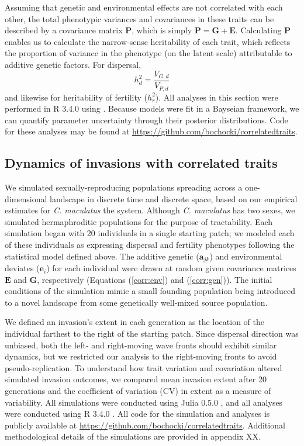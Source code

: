 Assuming that genetic and environmental effects are not correlated with each other, the total phenotypic variances and covariances in these traits can be described by a covariance matrix $\bm{P}$, which is simply $\bm{P} = \bm{G} + \bm{E}$. Calculating $\bm{P}$ enables us to calculate the narrow-sense heritability of each trait, which reflects the proportion of variance in the phenotype (on the latent scale) attributable to additive genetic factors. For dispersal,
%
\begin{equation}\label{corr:heritability}
  h^{2}_d = \frac{V_{G,d}}{V_{P,d}}
\end{equation}
%
and likewise for heritability of fertility ($h^{2}_r$). All analyses in this section were performed in R 3.4.0 \citep{r_core_team_r:_2015} using  \citep{stan_development_team_rstan:_2015}. Because models were fit in a Bayseian framework, we can quantify parameter uncertainty through their posterior distributions. Code for these analyses may be found at \url{https://github.com/bochocki/correlatedtraits}. 

\subsection{Dynamics of invasions with correlated traits}
We simulated sexually-reproducing populations spreading across a one-dimensional landscape in discrete time and discrete space, based on our empirical estimates for \textit{C. maculatus} the system. Although \textit{C. maculatus} has two sexes, we simulated hermaphroditic populations for the purpose of tractability. Each simulation began with 20 individuals in a single starting patch; we modeled each of these individuals as expressing dispersal and fertility phenotypes following the statistical model defined above. The additive genetic ($\bm{a}_{jk}$) and environmental deviates ($\bm{e}_i$) for each individual were drawn at random given covariance matrices $\bm{E}$ and $\bm{G}$, respectively (Equations (\ref{corr:env}) and (\ref{corr:gen})). The initial conditions of the simulation mimic a small founding population being introduced to a novel landscape from some genetically well-mixed source population. 

We defined an invasion's extent in each generation as the location of the individual farthest to the right of the starting patch. Since dispersal direction was unbiased, both the left- and right-moving wave fronts should exhibit similar dynamics, but we restricted our analysis to the right-moving fronts to avoid pseudo-replication. To understand how trait variation and covariation altered simulated invasion outcomes, we compared mean invasion extent after 20 generations and the coefficient of variation (CV) in extent as a measure of variability. All simulations were conducted using Julia 0.5.0 \citep{bezanson_julia:_2017}, and all analyses were conducted using R 3.4.0 \citep{r_core_team_r:_2015}. All code for the simulation and analyses is publicly available at \url{https://github.com/bochocki/correlatedtraits}. Additional methodological details of the simulations are provided in appendix XX.

